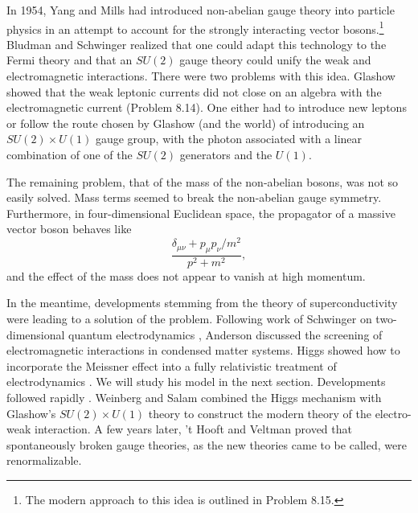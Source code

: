 In 1954, Yang and Mills \cite{banks-ref-64} had introduced non-abelian gauge theory into
particle physics in an attempt to account for the strongly interacting vector
bosons.\footnote[5]{The modern approach to this idea is outlined in Problem
8.15.} Bludman \cite{banks-ref-65} and Schwinger \cite{banks-ref-66} realized that one could adapt this
technology to the Fermi theory and that an $SU(2)$ gauge theory could unify the
weak and electromagnetic interactions. There were two problems with this idea.
Glashow \cite{banks-ref-67} showed that the weak leptonic currents did not close on an algebra
with the electromagnetic current (Problem 8.14). One either had to introduce
new leptons or follow the route chosen by Glashow (and the world) of introducing
an $SU(2)\times U(1)$ gauge group, with the photon associated with a linear
combination of one of the $SU(2)$ generators and the $U(1)$.

The remaining problem, that of the mass of the non-abelian bosons, was not so
easily solved. Mass terms seemed to break the non-abelian gauge symmetry.
Furthermore, in four-dimensional Euclidean space, the propagator of a massive
vector boson behaves like
\begin{equation*}
  \frac{\delta_{\mu\nu}+p_\mu p_\nu/m^2}{p^2+m^2},
\end{equation*}
and the effect of the mass does not appear to vanish at high momentum.

In the meantime, developments stemming from the theory of superconductivity
were leading to a solution of the problem. Following work of Schwinger on
two-dimensional quantum electrodynamics \cite{banks-ref-68}, Anderson \cite{banks-ref-69} discussed the
screening of electromagnetic interactions in condensed matter systems. Higgs
showed how to incorporate the Meissner effect into a fully relativistic
treatment of electrodynamics \cite{banks-ref-70,banks-ref-71,banks-ref-72}. We will study his model in the next
section. Developments followed rapidly \cite{banks-ref-73,banks-ref-74}. Weinberg \cite{banks-ref-75} and Salam \cite{banks-ref-76}
combined the Higgs mechanism with Glashow's $SU(2)\times U(1)$ theory to
construct the modern theory of the electro-weak interaction. A few years later,
't Hooft and Veltman \cite{banks-ref-77,banks-ref-78} proved that spontaneously broken gauge theories,
as the new theories came to be called, were renormalizable.

